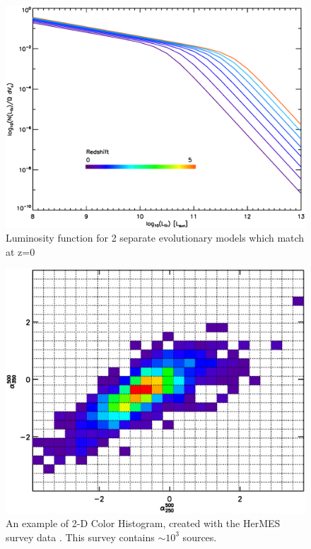 \documentclass[twocolumn,letterpaper,10pt]{article}
\begin{document}
\begin{figure}
\centering
\includegraphics[width=\textwidth]{sim_lumfunct.eps}
\caption{Luminosity function for 2 separate evolutionary models which match at z=0}
\label{lf}
\end{figure}

\begin{figure}
  \includegraphics[width=\textwidth]{obs_color_hist.eps}
  \caption{An example of 2-D Color Histogram, created with the HerMES survey data \citep{HerMES}. This survey contains $\sim 10^3$ sources.}
  \label{fig:hist1}
\end{figure}
\end{document}
